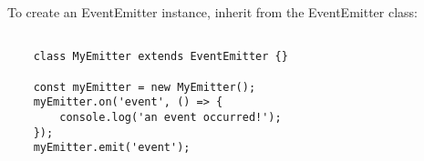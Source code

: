 \documentclass{scrartcl}
\begin{document}
To create an EventEmitter instance, inherit from the EventEmitter class:

\begin{lstlisting}[style=ES6]

    class MyEmitter extends EventEmitter {}

    const myEmitter = new MyEmitter();
    myEmitter.on('event', () => {
        console.log('an event occurred!');
    });
    myEmitter.emit('event');

\end{lstlisting}



\begin{lstlisting}[style=ES6]

\end{lstlisting}

\begin{lstlisting}[style=ES6]

\end{lstlisting}

\begin{lstlisting}[style=ES6]

\end{lstlisting}

\begin{lstlisting}[style=ES6]

\end{lstlisting}

\begin{lstlisting}[style=ES6]

\end{lstlisting}

\begin{lstlisting}[style=ES6]

\end{lstlisting}

\begin{lstlisting}[style=ES6]

\end{lstlisting}

\begin{lstlisting}[style=ES6]

\end{lstlisting}

\begin{lstlisting}[style=ES6]

\end{lstlisting}

\begin{lstlisting}[style=ES6]

\end{lstlisting}
\end{document}
